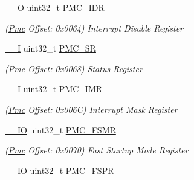 \begin{DoxyCompactItemize}
\mbox{\label{structPmc_a8cb72dfd228888a4df1931fe656282e5}} 
\mbox{\hyperlink{core__cm7_8h_a7e25d9380f9ef903923964322e71f2f6}{\+\_\+\+\_\+O}} uint32\+\_\+t \mbox{\hyperlink{structPmc_a8cb72dfd228888a4df1931fe656282e5}{P\+M\+C\+\_\+\+I\+DR}}
\begin{DoxyCompactList}\small\item\em (\mbox{\hyperlink{structPmc}{Pmc}} Offset\+: 0x0064) Interrupt Disable Register \end{DoxyCompactList}\item 
\mbox{\label{structPmc_a3098593807c6fa0a9449eaf17dbd753e}} 
\mbox{\hyperlink{core__cm7_8h_af63697ed9952cc71e1225efe205f6cd3}{\+\_\+\+\_\+I}} uint32\+\_\+t \mbox{\hyperlink{structPmc_a3098593807c6fa0a9449eaf17dbd753e}{P\+M\+C\+\_\+\+SR}}
\begin{DoxyCompactList}\small\item\em (\mbox{\hyperlink{structPmc}{Pmc}} Offset\+: 0x0068) Status Register \end{DoxyCompactList}\item 
\mbox{\label{structPmc_a5d281a26532f3ddec0c753577c8ea82a}} 
\mbox{\hyperlink{core__cm7_8h_af63697ed9952cc71e1225efe205f6cd3}{\+\_\+\+\_\+I}} uint32\+\_\+t \mbox{\hyperlink{structPmc_a5d281a26532f3ddec0c753577c8ea82a}{P\+M\+C\+\_\+\+I\+MR}}
\begin{DoxyCompactList}\small\item\em (\mbox{\hyperlink{structPmc}{Pmc}} Offset\+: 0x006C) Interrupt Mask Register \end{DoxyCompactList}\item 
\mbox{\label{structPmc_a2cb5a918a4d51c32d413bb55184531c4}} 
\mbox{\hyperlink{core__cm7_8h_aec43007d9998a0a0e01faede4133d6be}{\+\_\+\+\_\+\+IO}} uint32\+\_\+t \mbox{\hyperlink{structPmc_a2cb5a918a4d51c32d413bb55184531c4}{P\+M\+C\+\_\+\+F\+S\+MR}}
\begin{DoxyCompactList}\small\item\em (\mbox{\hyperlink{structPmc}{Pmc}} Offset\+: 0x0070) Fast Startup Mode Register \end{DoxyCompactList}\item 
\mbox{\label{structPmc_ab22b8d8bfe282bf2110fc275c38047c0}} 
\mbox{\hyperlink{core__cm7_8h_aec43007d9998a0a0e01faede4133d6be}{\+\_\+\+\_\+\+IO}} uint32\+\_\+t \mbox{\hyperlink{structPmc_ab22b8d8bfe282bf2110fc275c38047c0}{P\+M\+C\+\_\+\+F\+S\+PR}}

\end{DoxyCompactItemize}

